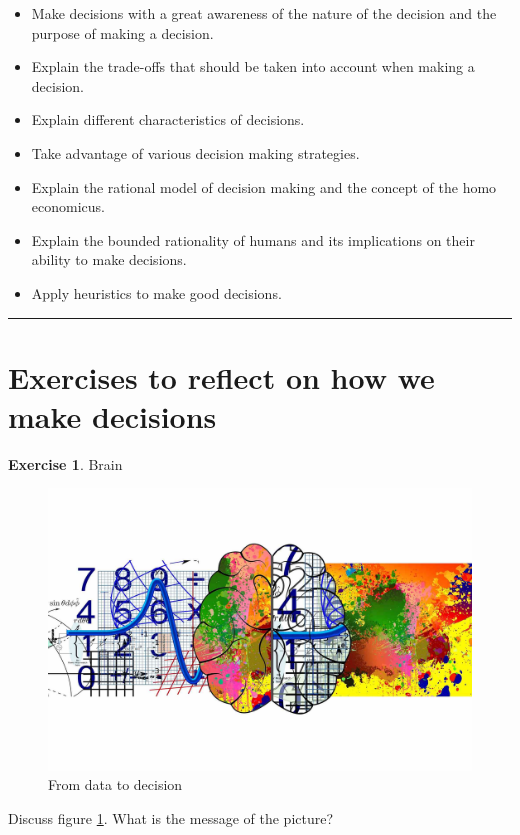 \documentclass[
  12pt,
  oneside]{book}
\providecommand{\tightlist}{%
  \setlength{\itemsep}{0pt}\setlength{\parskip}{0pt}}
\theoremstyle{definition}
\theoremstyle{definition}
\theoremstyle{definition}
\newtheorem{exercise}{Exercise}[chapter]
\theoremstyle{definition}
\theoremstyle{remark}
\begin{document}
\begin{itemize}
\tightlist
\item
  Make decisions with a great awareness of the nature of the decision and the purpose of making a decision.
\item
  Explain the trade-offs that should be taken into account when making a decision.
\item
  Explain different characteristics of decisions.
\item
  Take advantage of various decision making strategies.
\item
  Explain the rational model of decision making and the concept of the homo economicus.
\item
  Explain the bounded rationality of humans and its implications on their ability to make decisions.
\item
  Apply heuristics to make good decisions.
\end{itemize}

\begin{center}\rule{0.5\linewidth}{0.5pt}\end{center}

\hypertarget{exercises-to-reflect-on-how-we-make-decisions}{%
\section{Exercises to reflect on how we make decisions}\label{exercises-to-reflect-on-how-we-make-decisions}}

\begin{exercise}
\protect\hypertarget{exr:brain-color}{}\label{exr:brain-color}Brain

\begin{figure}
\centering
\includegraphics[width=1\textwidth,height=\textheight]{fig/brain-color.jpg}
\caption[\label{fig:brain-color} From data to decision]{\label{fig:brain-color} From data to decision\footnotemark{}}
\end{figure}

Discuss figure \ref{fig:brain-color}. What is the message of the picture?
\end{exercise}
\end{document}
